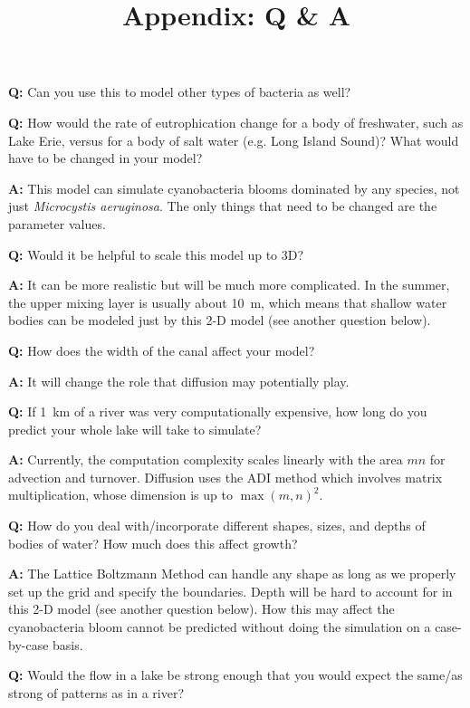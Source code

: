 \documentclass{article}
\title{Appendix: Q \& A}
\date{}
\begin{document}
\maketitle

\textbf{Q:} Can you use this to model other types of bacteria as well?

\textbf{Q:} How would the rate of eutrophication change for a body of freshwater, such as Lake Erie, versus for a body of salt water (e.g. Long Island Sound)? What would have to be changed in your model? 

\textbf{A:} This model can simulate cyanobacteria blooms dominated by any species, not just \textit{Microcystis aeruginosa}. The only things that need to be changed are the parameter values.
\bigskip

\textbf{Q:} Would it be helpful to scale this model up to 3D?

\textbf{A:} It can be more realistic but will be much more complicated. In the summer, the upper mixing layer is usually about \SI{10}{m}, which means that shallow water bodies can be modeled just by this 2-D model (see another question below).
\bigskip

\textbf{Q:} How does the width of the canal affect your model?

\textbf{A:} It will change the role that diffusion may potentially play.
\bigskip

\textbf{Q:} If \SI{1}{km} of a river was very computationally expensive, how long do you predict your whole lake will take to simulate?

\textbf{A:} Currently, the computation complexity scales linearly with the area $mn$ for advection and turnover. Diffusion uses the ADI method which involves matrix multiplication, whose dimension is up to $\max(m, n)^2$. 
\bigskip

\textbf{Q:} How do you deal with/incorporate different shapes, sizes, and depths of bodies of water? How much does this affect growth?

\textbf{A:} The Lattice Boltzmann Method can handle any shape as long as we properly set up the grid and specify the boundaries. Depth will be hard to account for in this 2-D model (see another question below). How this may affect the cyanobacteria bloom cannot be predicted without doing the simulation on a case-by-case basis.
\bigskip

\textbf{Q:} Would the flow in a lake be strong enough that you would expect the same/as strong of patterns as in a river?
\end{document}
